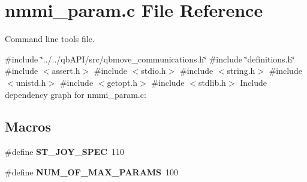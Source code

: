 \section{nmmi\+\_\+param.\+c File Reference}
\label{nmmi__param_8c}


Command line tools file.  


{\ttfamily \#include \char`\"{}../../qb\+A\+P\+I/src/qbmove\+\_\+communications.\+h\char`\"{}}\newline
{\ttfamily \#include \char`\"{}definitions.\+h\char`\"{}}\newline
{\ttfamily \#include $<$assert.\+h$>$}\newline
{\ttfamily \#include $<$stdio.\+h$>$}\newline
{\ttfamily \#include $<$string.\+h$>$}\newline
{\ttfamily \#include $<$unistd.\+h$>$}\newline
{\ttfamily \#include $<$getopt.\+h$>$}\newline
{\ttfamily \#include $<$stdlib.\+h$>$}\newline
Include dependency graph for nmmi\+\_\+param.\+c\+:
\subsection*{Macros}
\begin{DoxyCompactItemize}
\item 
\mbox{\label{nmmi__param_8c_ae485f34b39604cd4ae1d475911e68aaa}} 
\#define {\bfseries S\+T\+\_\+\+J\+O\+Y\+\_\+\+S\+P\+EC}~110
\item 
\mbox{\label{nmmi__param_8c_a1631ab57d507b38c3bd2bde962254ac4}} 
\#define {\bfseries N\+U\+M\+\_\+\+O\+F\+\_\+\+M\+A\+X\+\_\+\+P\+A\+R\+A\+MS}~100
\end{DoxyCompactItemize}
